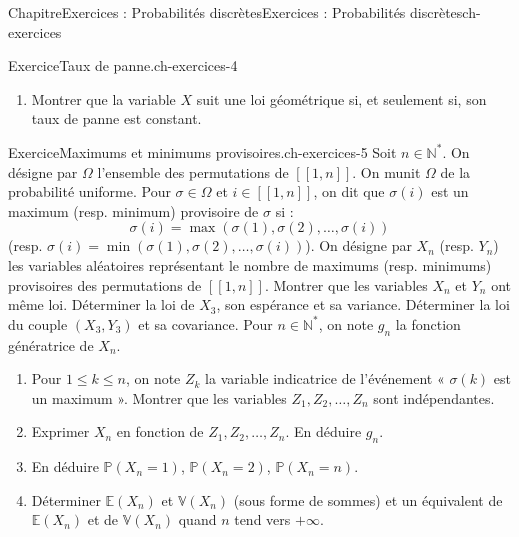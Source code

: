 \documentclass[twoside,10pt,]{book}
\newcommand{\blocktitlefont}{\relax}
\numberwithin{equation}{chapter}
\newcommand{\N}{\mathbb N}
\renewcommand{\Pr}{\mathbb P}
\newcommand{\Es}{\mathbb E}
\newcommand{\Va}{\mathbb V}
\renewcommand\llbracket{[\![}
\renewcommand\rrbracket{]\!]}
\begin{document}
\begin{chapterptx}{Chapitre}{Exercices : Probabilités discrètes}{}{Exercices : Probabilités discrètes}{}{}{ch-exercices}
\begin{inlineexercise}{Exercice}{Taux de panne.}{ch-exercices-4}
\begin{enumerate}[font=\bfseries,label=(\alph*),ref=\alph*]
\begin{enumerate}[label={\arabic*.}]
\end{enumerate}
%
\par\smallskip%
\noindent\textbf{\blocktitlefont Indication}.\hypertarget{ch-exercices-4-4-3}{}\quad{}On rappelle que pour une suite \((p_n)_n\) de réels positifs sommable et de somme \(1\), il existe une variable aléatoire \(X\) telle que \(\Pr(X=n)=p_n\) pour tout \(n\).%
\item{}Montrer que la variable \(X\) suit une loi géométrique si, et seulement si, son taux de panne est constant.%
\end{enumerate}%
\end{inlineexercise}%
\begin{inlineexercise}{Exercice}{Maximums et minimums provisoires.}{ch-exercices-5}%
Soit \(n \in \N^{*}\). On désigne par \(\Omega\) l'ensemble des permutations de \(\llbracket 1, n \rrbracket\). On munit \(\Omega\) de la probabilité uniforme. Pour \(\sigma \in \Omega\) et \(i \in \llbracket 1, n \rrbracket\), on dit que \(\sigma(i)\) est un maximum (resp. minimum) provisoire de \(\sigma\) si :%
\begin{equation*}
\sigma(i) = \max (\sigma(1), \sigma(2), \ldots, \sigma(i))
\end{equation*}
(resp. \(\sigma(i) = \min (\sigma(1), \sigma(2), \ldots, \sigma(i))\)). On désigne par \(X_{n}\) (resp. \(Y_{n}\)) les variables aléatoires représentant le nombre de maximums (resp. minimums) provisoires des permutations de \(\llbracket 1, n \rrbracket\).%
Montrer que les variables \(X_{n}\) et \(Y_{n}\) ont même loi.%
Déterminer la loi de \(X_{3}\), son espérance et sa variance.%
Déterminer la loi du couple \((X_{3}, Y_{3})\) et sa covariance.%
Pour \(n \in \N^{*}\), on note \(g_{n}\) la fonction génératrice de \(X_{n}\).%
%
\begin{enumerate}[label={\arabic*.}]
\item{}Pour \(1 \leqslant k \leqslant n\), on note \(Z_{k}\) la variable indicatrice de l'événement « \(\sigma(k)\) est un maximum ». Montrer que les variables \(Z_{1}, Z_{2}, \ldots, Z_{n}\) sont indépendantes.%
\item{}Exprimer \(X_{n}\) en fonction de \(Z_{1}, Z_{2}, \ldots, Z_{n}\). En déduire \(g_{n}\).%
\item{}En déduire \(\Pr(X_{n}=1)\), \(\Pr(X_{n}=2)\), \(\Pr(X_{n}=n)\).%
\item{}Déterminer \(\Es(X_{n})\) et \(\Va(X_{n})\) (sous forme de sommes) et un équivalent de \(\Es(X_{n})\) et de \(\Va(X_{n})\) quand \(n\) tend vers \(+\infty\).%
\end{enumerate}

\end{inlineexercise}
\end{chapterptx}
\end{document}
